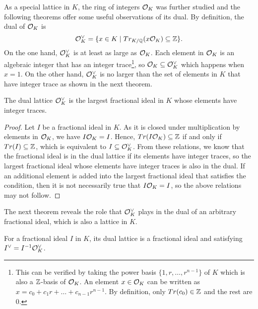 \documentclass[../main.tex]{subfiles}
\begin{document}
As a special lattice in $K$, the ring of integers $\mathcal{O}_K$ was further studied and the following theorems offer some useful observations of its dual. By definition, the dual of $\mathcal{O}_K$ is 
\begin{equation*}
    \mathcal{O}_K^{\vee} = \{x \in K \mid Tr_{K/\mathbb{Q}}(x \mathcal{O}_K) \subseteq \mathbb{Z}\}.
\end{equation*}
On the one hand, $\mathcal{O}_K^{\vee}$ is at least as large as $\mathcal{O}_K$. Each element in $\mathcal{O}_K$ is an algebraic integer that has an integer trace\footnote{This can be verified by taking the power basis $\{1, r, \dots, r^{n-1}\}$ of $K$ which is also a $\mathbb{Z}$-basis of $\mathcal{O}_K$. An element $x \in \mathcal{O}_K$ can be written as $x=c_0+c_1 r + \dots + c_{n-1}r^{n-1}$. By definition, only $Tr(c_0) \in \mathbb{Z}$ and the rest are 0.}, so $\mathcal{O}_K \subseteq \mathcal{O}_K^{\vee}$ which happens when $x=1$. On the other hand, $\mathcal{O}_K^{\vee}$ is no larger than the set of elements in $K$ that have integer trace as shown in the next theorem. 

\begin{theorem}
\reversemarginpar
{}
The dual lattice $\mathcal{O}_K^{\vee}$ is the largest fractional ideal in $K$ whose elements have integer traces. 
\end{theorem}

\begin{proof}
Let $I$ be a fractional ideal in $K$. As it is closed under multiplication by elements in $\mathcal{O}_K$, we have $I\mathcal{O}_K=I$. Hence, $Tr(I\mathcal{O}_K)\subseteq \mathbb{Z}$ if and only if $Tr(I) \subseteq \mathbb{Z}$, which is equivalent to $I \subseteq \mathcal{O}_K^{\vee}$. From these relations, we know that the fractional ideal is in the dual lattice if its elements have integer traces, so the largest fractional ideal whose elements have integer traces is also in the dual. If an additional element is added into the largest fractional ideal that satisfies the condition, then it is not necessarily true that $I\mathcal{O}_K=I$, so the above relations may not follow.  
\end{proof}

The next theorem reveals the role that $\mathcal{O}_K^{\vee}$ plays in the dual of an arbitrary fractional ideal, which is also a lattice in $K$. 

\begin{theorem}
\label{app thm:fracIdealDual}
\reversemarginpar
{}
For a fractional ideal $I$ in $K$, its dual lattice is a fractional ideal and satisfying $I^{\vee} = I^{-1} \mathcal{O}_K^{\vee}$.
\end{theorem}
\end{document}
